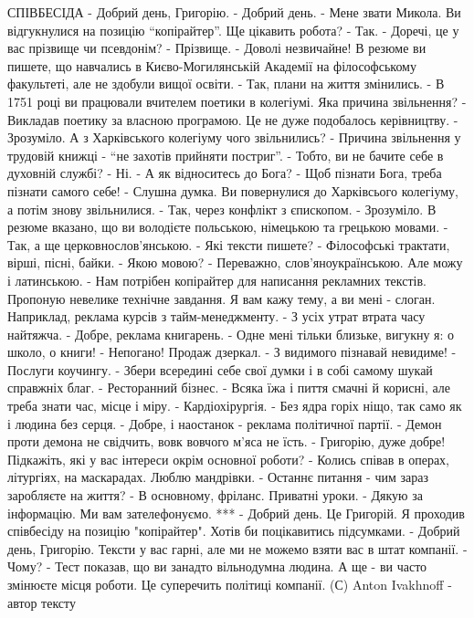\obeycr
СПІВБЕСІДА
- Добрий день, Григорію. 
- Добрий день.
- Мене звати Микола. Ви відгукнулися на позицію \enquote{копірайтер}. Ще цікавить робота?
- Так.
- Доречі, це у вас прізвище чи псевдонім?
- Прізвище.
- Доволі незвичайне! В резюме ви пишете, що навчались в Києво-Могилянській Академії на філософському факультеті, але не здобули вищої освіти.
- Так, плани на життя змінились. 
- В 1751 році ви працювали вчителем поетики в колегіумі. Яка причина звільнення?
- Викладав поетику за власною програмою. Це не дуже подобалось керівництву.
- Зрозуміло. А з Харківського колегіуму чого звільнились?
- Причина звільнення у трудовій книжці - \enquote{не захотів прийняти постриг}.
- Тобто, ви не бачите себе в духовній службі?
- Ні.
- А як відноситесь до Бога?
- Щоб пізнати Бога, треба пізнати самого себе! 
- Слушна думка. Ви повернулися до Харківсього колегіуму, а потім знову звільнилися.
- Так, через конфлікт з єпископом.
- Зрозуміло. В резюме вказано, що ви володієте польською, німецькою та грецькою мовами.
- Так, а ще церковнослов'янською.
- Які тексти пишете?
- Філософські трактати, вірші, пісні, байки.
- Якою мовою?
- Переважно, слов'яноукраїнською. Але можу і латинською.
- Нам потрібен копірайтер для написання рекламних текстів. Пропоную невелике технічне завдання. Я вам кажу тему, а ви мені - слоган. Наприклад, реклама курсів з тайм-менеджменту.
- З усіх утрат втрата часу найтяжча.
- Добре, реклама книгарень.
- Одне мені тільки близьке, вигукну я: о школо, о книги!
- Непогано! Продаж дзеркал.
- З видимого пізнавай невидиме!
- Послуги коучингу.
- Збери всередині себе свої думки і в собі самому шукай справжніх благ.
- Ресторанний бізнес.
- Всяка їжа і пиття смачні й корисні, але треба знати час, місце і міру.
- Кардіохірургія.
- Без ядра горіх ніщо, так само як і людина без серця.
- Добре, і наостанок - реклама політичної партії.
- Демон проти демона не свідчить, вовк вовчого м'яса не їсть.
- Григорію, дуже добре! Підкажіть, які у вас інтереси окрім основної роботи?
- Колись співав в операх, літургіях, на маскарадах. Люблю мандрівки.
- Останнє питання - чим зараз заробляєте на життя?
- В основному, фріланс. Приватні уроки.
- Дякую за інформацію. Ми вам зателефонуємо.
***
- Добрий день. Це Григорій. Я проходив співбесіду на позицію "копірайтер". Хотів би поцікавитись підсумками.
- Добрий день, Григорію. Тексти у вас гарні, але ми не можемо взяти вас в штат компанії.
- Чому?
- Тест показав, що ви занадто вільнодумна людина. А ще - ви часто змінюєте місця роботи. Це суперечить політиці компанії.
(С) Anton Ivakhnoff - автор тексту
\restorecr
